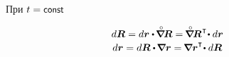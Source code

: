 \begin{otherlanguage}{russian}

При ${t = \const}$

\nopagebreak\vspace{-0.4em}
\begin{equation*}
\begin{array}{c@{\hspace*{4em}}}
d\bm{R} = d\bm{r} \dotp \hspace{-0.2ex} \tikzmark{beginFtransposed} \boldnablacircled \hspace{-0.16ex} \bm{R} \tikzmark{endFtransposed} = \hspace{-0.2ex} \tikzmark{beginMotionGradient} \boldnablacircled \hspace{-0.16ex} \bm{R}^{\hspace{.1ex}\T} \tikzmark{endMotionGradient} \hspace{-0.4ex} \dotp d\bm{r} \\[.2em]
%
d\bm{r} = d\bm{R} \dotp \hspace{-0.2ex} \tikzmark{beginFtransposedinverse} \boldnabla \bm{r} \tikzmark{endFtransposedinverse} = \hspace{-0.2ex} \tikzmark{beginFinverse} \boldnabla \bm{r}^{\T} \hspace{-0.4ex} \tikzmark{endFinverse} \dotp d\bm{R}
\end{array}
\end{equation*}%
\end{otherlanguage}
